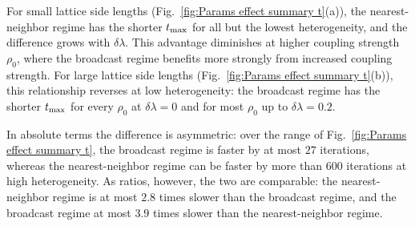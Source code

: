 \documentclass[a4paper,fleqn]{cas-sc}
\begin{document}
    For small lattice side lengths (Fig.~\ref{fig:Params effect summary t}(a)), the nearest-neighbor regime has the shorter $t_{\rm max}$ for all but the lowest heterogeneity, and the difference grows with $\delta\lambda$.
    This advantage diminishes at higher coupling strength $\rho_0$, where the broadcast regime benefits more strongly from increased coupling strength.
    For large lattice side lengths (Fig.~\ref{fig:Params effect summary t}(b)), this relationship reverses at low heterogeneity: the broadcast regime has the shorter $t_{\rm max}$ for every $\rho_0$ at $\delta\lambda=0$ and for most $\rho_0$ up to $\delta\lambda=0.2$.

    In absolute terms the difference is asymmetric: over the range of Fig.~\ref{fig:Params effect summary t}, the broadcast regime is faster by at most $27$ iterations, whereas the nearest-neighbor regime can be faster by more than $600$ iterations at high heterogeneity.
    As ratios, however, the two are comparable: the nearest-neighbor regime is at most $2.8$ times slower than the broadcast regime, and the broadcast regime at most $3.9$ times slower than the nearest-neighbor regime.
\end{document}
